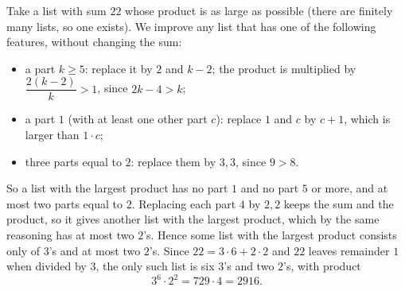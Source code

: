 Take a list with sum $22$ whose product is as large as possible (there are finitely many lists, so one exists). We improve any list that has one of the following features, without changing the sum:
\begin{itemize}
\item a part $k\ge5$: replace it by $2$ and $k-2$; the product is multiplied by $\dfrac{2(k-2)}{k}>1$, since $2k-4>k$;
\item a part $1$ (with at least one other part $c$): replace $1$ and $c$ by $c+1$, which is larger than $1\cdot c$;
\item three parts equal to $2$: replace them by $3,3$, since $9>8$.
\end{itemize}
So a list with the largest product has no part $1$ and no part $5$ or more, and at most two parts equal to $2$. Replacing each part $4$ by $2,2$ keeps the sum and the product, so it gives another list with the largest product, which by the same reasoning has at most two $2$'s. Hence some list with the largest product consists only of $3$'s and at most two $2$'s. Since $22=3\cdot6+2\cdot2$ and $22$ leaves remainder $1$ when divided by $3$, the only such list is six $3$'s and two $2$'s, with product
\[3^6\cdot2^2=729\cdot4=\boxed{2916}.\]
